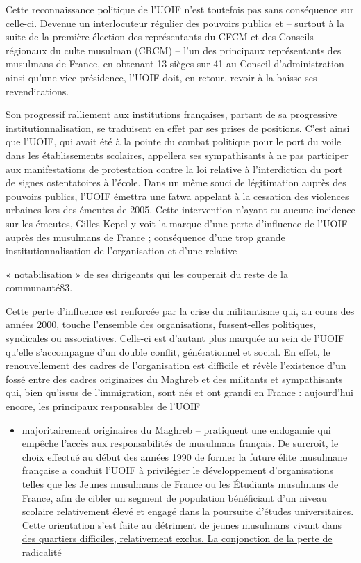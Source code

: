Cette reconnaissance politique de l'UOIF n'est toutefois pas sans
conséquence sur celle-ci. Devenue un interlocuteur régulier des pouvoirs
publics et -- surtout à la suite de la première élection des
représentants du CFCM et des Conseils régionaux du culte musulman (CRCM)
-- l'un des principaux représentants des musulmans de France, en
obtenant 13 sièges sur 41 au Conseil d'administration ainsi qu'une
vice-présidence, l'UOIF doit, en retour, revoir à la baisse ses
revendications.

Son progressif ralliement aux institutions françaises, partant de sa
progressive institutionnalisation, se traduisent en effet par ses prises
de positions. C'est ainsi que l'UOIF, qui avait été à la pointe du
combat politique pour le port du voile dans les établissements
scolaires, appellera ses sympathisants à ne pas participer aux
manifestations de protestation contre la loi relative à l'interdiction
du port de signes ostentatoires à l'école. Dans un même souci de
légitimation auprès des pouvoirs publics, l'UOIF émettra une fatwa
appelant à la cessation des violences urbaines lors des émeutes de 2005.
Cette intervention n'ayant eu aucune incidence sur les émeutes, Gilles
Kepel y voit la marque d'une perte d'influence de l'UOIF auprès des
musulmans de France ; conséquence d'une trop grande
institutionnalisation de l'organisation et d'une relative

« notabilisation » de ses dirigeants qui les couperait du reste de la
communauté83.

Cette perte d'influence est renforcée par la crise du militantisme qui,
au cours des années 2000, touche l'ensemble des organisations,
fussent-elles politiques, syndicales ou associatives. Celle-ci est
d'autant plus marquée au sein de l'UOIF qu'elle s'accompagne d'un double
conflit, générationnel et social. En effet, le renouvellement des cadres
de l'organisation est difficile et révèle l'existence d'un fossé entre
des cadres originaires du Maghreb et des militants et sympathisants qui,
bien qu'issus de l'immigration, sont nés et ont grandi en France :
aujourd'hui encore, les principaux responsables de l'UOIF


\begin{itemize}
\item
  
  majoritairement originaires du Maghreb -- pratiquent une endogamie qui
  empêche l'accès aux responsabilités de musulmans français. De
  surcroît, le choix effectué au début des années 1990 de former la
  future élite musulmane française a conduit l'UOIF à privilégier le
  développement d'organisations telles que les Jeunes musulmans de
  France ou les Étudiants musulmans de France, afin de cibler un segment
  de population bénéficiant d'un niveau scolaire relativement élevé et
  engagé dans la poursuite d'études universitaires. Cette orientation
  s'est faite au détriment de jeunes musulmans vivant \underline{dans
  des quartiers difficiles, relativement exclus. La conjonction de la
  perte de radicalité}
  
\end{itemize}


